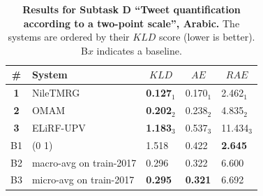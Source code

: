 \begin{table}[tbh]
\centering
\begin{small}
\renewcommand{\arraystretch}{1.0}%
\setlength{\tabcolsep}{3.3pt}
\begin{tabular}{|c|l|l|l|l|}
\hline
      \bf \# & \bf System & \multicolumn{1}{c|}{$KLD$} & \multicolumn{1}{c|}{$AE$} &\multicolumn{1}{c|}{$RAE$} \\
\hline
\bf 1 & NileTMRG & \bf 0.127$_{1}$ & 0.170$_{1}$ & 2.462$_{1}$ \\
\bf 2 & OMAM & \bf 0.202$_{2}$ & 0.238$_{2}$ & 4.835$_{2}$ \\
\bf 3 & ELiRF-UPV & \bf 1.183$_{3}$ & 0.537$_{3}$ & 11.434$_{3}$ \\
\hline
B1 & (0 1) & 1.518 & 0.422 & \bf 2.645\\
B2 & macro-avg on train-2017 & 0.296 & 0.322 & 6.600\\
B3 & micro-avg on train-2017 & \bf 0.295 & \bf 0.321 & 6.692\\
\hline
\end{tabular}
\caption{\textbf{Results for Subtask D ``Tweet quantification according to a two-point scale'', Arabic.} The systems are ordered by their $KLD$ score (lower is better). B$x$ indicates a baseline.}
\label{table:ResultsSubtaskD:Arabic}
\end{small}
\end{table}
